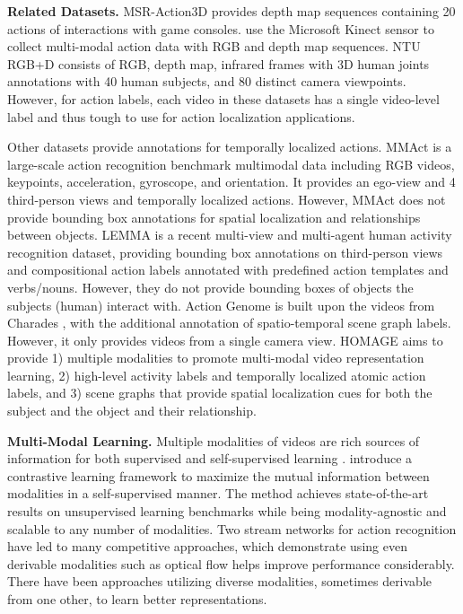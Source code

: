 \documentclass[final]{cvpr}
\begin{document}
\noindent\textbf{Related Datasets.}
MSR-Action3D \cite{li2010action} provides depth map sequences containing 20 actions of interactions with game consoles. \cite{liu2017pku, ni2011rgbd, shahroudy2016ntu, sung2011human} use the Microsoft Kinect sensor to collect multi-modal action data with RGB and depth map sequences. NTU RGB+D \cite{shahroudy2016ntu} consists of RGB, depth map, infrared frames with 3D human joints annotations with 40 human subjects, and 80 distinct camera viewpoints. However, for action labels, each video in these datasets has a single video-level label and thus tough to use for action localization applications.

Other datasets \cite{activitynet, liu2017pku, kong2019mmact, jia2020lemma, action_genome} provide annotations for temporally localized actions. MMAct \cite{kong2019mmact} is a large-scale action recognition benchmark multimodal data including RGB videos, keypoints, acceleration, gyroscope, and orientation. It provides an ego-view and 4 third-person views and temporally localized actions. However, MMAct does not provide bounding box annotations for spatial localization and relationships between objects. LEMMA \cite{jia2020lemma} is a recent multi-view and multi-agent human activity recognition dataset, providing bounding box annotations on third-person views and compositional action labels annotated with predefined action templates and verbs/nouns. However, they do not provide bounding boxes of objects the subjects (human) interact with. Action Genome \cite{action_genome} is built upon the videos from Charades \cite{sigurdsson2016hollywood}, with the additional annotation of spatio-temporal scene graph labels. However, it only provides videos from a single camera view. HOMAGE aims to provide 1) multiple modalities to promote multi-modal video representation learning, 2) high-level activity labels and temporally localized atomic action labels, and 3) scene graphs that provide spatial localization cues for both the subject and the object and their relationship.


\noindent\textbf{Multi-Modal Learning.} Multiple modalities of videos are rich sources of information for both supervised \cite{simonyanTwoStream14} and self-supervised learning \cite{crossLearn, cmc, vgan}. \cite{korbar2018cooperative, cmc} introduce a contrastive learning framework to maximize the mutual information between modalities in a self-supervised manner. The method achieves state-of-the-art results on unsupervised learning benchmarks while being modality-agnostic and scalable to any number of modalities. Two stream networks for action recognition \cite{simonyanTwoStream14} have led to many competitive approaches, which demonstrate using even derivable modalities such as optical flow helps improve performance considerably. There have been approaches \cite{lt_motion, vgan, cmc, crossLearn} utilizing diverse modalities, sometimes derivable from one other, to learn better representations.
\end{document}
